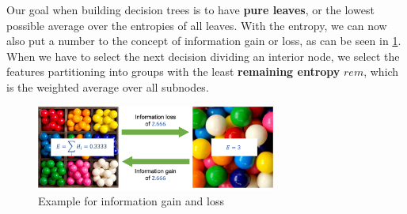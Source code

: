 Our goal when building decision trees is to have \textbf{pure leaves}, or the lowest possible average over the entropies of all leaves. With the entropy, we can now also put a number to the concept of information gain or loss, as can be seen in \ref{fig:3_information_gain_example}. When we have to select the next decision dividing an interior node, we select the features partitioning into groups with the least \textbf{remaining entropy} $rem$, which is the weighted average over all subnodes.

\begin{figure}[h]
  \centering
  \includegraphics[width=0.7\textwidth]{assets/trees/entropy/loss_gain.png}
  \caption{Example for information gain and loss}
  \label{fig:3_information_gain_example}
\end{figure}

